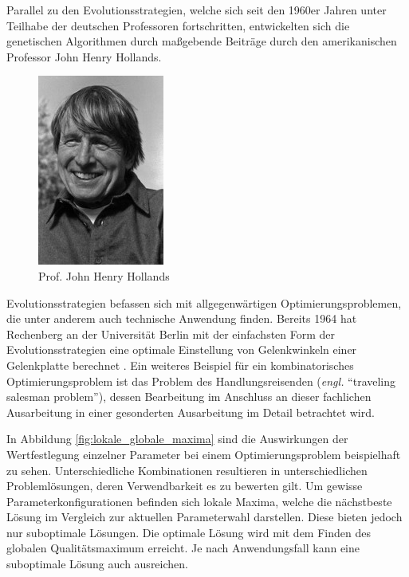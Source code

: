 Parallel zu den Evolutionsstrategien, welche sich seit den 1960er Jahren unter Teilhabe der deutschen Professoren fortschritten, entwickelten sich die genetischen Algorithmen durch maßgebende Beiträge durch den amerikanischen Professor John Henry Hollands.

\begin{figure}[H]
\centering
\includegraphics[height=0.6\textwidth]{img/Prof_John_Henry_Hollands.jpg}
\caption[Prof. John Henry Hollands]{Prof. John Henry Hollands \protect\footnotemark}
\label{fig:ingorechenberg}
\end{figure}

Evolutionsstrategien befassen sich mit allgegenwärtigen Optimierungsproblemen, die unter anderem auch technische Anwendung finden.
Bereits 1964 hat Rechenberg an der Universität Berlin mit der einfachsten Form der Evolutionsstrategien eine optimale Einstellung von Gelenkwinkeln einer Gelenkplatte berechnet \cite[S.~164-165]{schoeneburg}.
Ein weiteres Beispiel für ein kombinatorisches Optimierungsproblem ist das Problem des Handlungsreisenden (\textit{engl.} \enquote{traveling salesman problem}), dessen Bearbeitung im Anschluss an dieser fachlichen Ausarbeitung in einer gesonderten Ausarbeitung im Detail betrachtet wird.

In Abbildung \ref{fig:lokale_globale_maxima} sind die Auswirkungen der Wertfestlegung einzelner Parameter bei einem Optimierungsproblem beispielhaft zu sehen.
Unterschiedliche Kombinationen resultieren in unterschiedlichen Problemlösungen, deren Verwendbarkeit es zu bewerten gilt.
Um gewisse Parameterkonfigurationen befinden sich lokale Maxima, welche die nächstbeste Lösung im Vergleich zur aktuellen Parameterwahl darstellen. Diese bieten jedoch nur suboptimale Lösungen. Die optimale Lösung wird mit dem Finden des globalen Qualitätsmaximum erreicht. Je nach Anwendungsfall kann eine suboptimale Lösung auch ausreichen.

